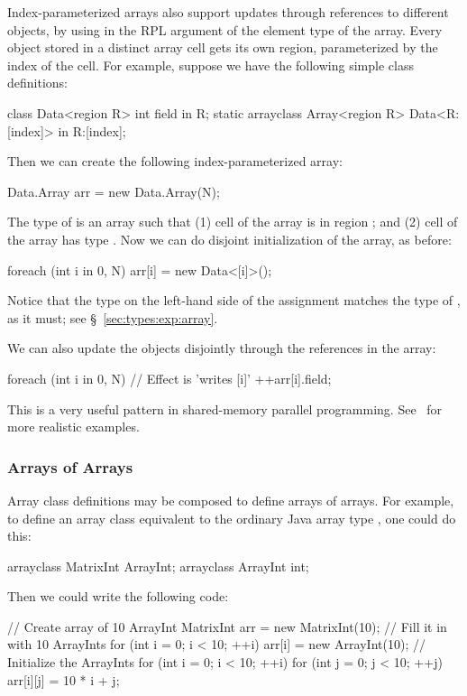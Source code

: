 Index-parameterized arrays also support updates through references to
different objects, by using \kwd{[index]} in the RPL argument of the
element type of the array.  Every object stored in a distinct array
cell gets its own region, parameterized by the index of the cell.  For
example, suppose we have the following simple class definitions:
%
\begin{dpjlisting}
class Data<region R> {
  int field in R;
  static arrayclass Array<region R> {
    Data<R:[index]> in R:[index];
  }
}
\end{dpjlisting}
%
Then we can create the following index-parameterized array:
%
\begin{dpjlisting}
Data.Array arr = new Data.Array(N);
\end{dpjlisting}
%
The type of  is an array such that (1) cell  of the
array is in region \kwd{[i]}; and (2) cell  of the array has
type .  Now we can do disjoint initialization of the
array, as before:
%
\begin{dpjlisting}
foreach (int i in 0, N)
  arr[i] = new Data<[i]>();
\end{dpjlisting}
%
Notice that the type  on the left-hand side of the
assignment matches the type of , as it must; see
\S~\ref{sec:types:exp:array}.

We can also update the objects disjointly through the references in
the array:
%
\begin{dpjlisting}
foreach (int i in 0, N) {
  // Effect is 'writes [i]'
  ++arr[i].field;
}
\end{dpjlisting}
%
This is a very useful pattern in shared-memory parallel programming.
See \tutorial\ for more realistic examples.


\subsubsection{Arrays of Arrays}

Array class definitions may be composed to define arrays of arrays.
For example, to define an array class equivalent to the ordinary Java
array type , one could do this:
%
\begin{dpjlisting}
arrayclass MatrixInt {
  ArrayInt;
}
arrayclass ArrayInt {
  int;
}
\end{dpjlisting}
%
Then we could write the following code:
%
\begin{dpjlisting}
// Create array of 10 ArrayInt
MatrixInt arr = new MatrixInt(10);
// Fill it in with 10 ArrayInts
for (int i = 0; i < 10; ++i)
  arr[i] = new ArrayInt(10);
// Initialize the ArrayInts
for (int i = 0; i < 10; ++i)
  for (int j = 0; j < 10; ++j)
    arr[i][j] = 10 * i + j;
\end{dpjlisting}

